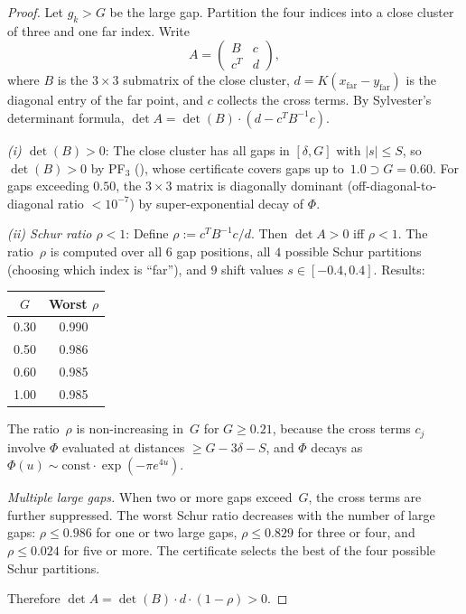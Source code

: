 \documentclass[11pt,a4paper]{amsart}
\theoremstyle{definition}
\theoremstyle{remark}
\begin{document}
\begin{proof}
Let $g_k > G$ be the large gap.
Partition the four indices into a close cluster of three and
one far index.
Write
\[
  A = \begin{pmatrix} B & c \\ c^T & d \end{pmatrix},
\]
where $B$ is the $3\times 3$ submatrix of the close cluster,
$d = K(x_{\text{far}} - y_{\text{far}})$ is the diagonal entry of
the far point, and $c$ collects the cross terms.
By Sylvester's determinant formula,
$\det A = \det(B)\cdot(d - c^T B^{-1} c)$.

\emph{(i) $\det(B) > 0$}:
The close cluster has all gaps in $[\delta, G]$ with $|s| \le S$,
so $\det(B) > 0$ by PF$_3$ (), whose certificate
covers gaps up to~$1.0 \supset G = 0.60$.
For gaps exceeding $0.50$, the $3\times 3$ matrix is
diagonally dominant (off-diagonal-to-diagonal ratio $< 10^{-7}$)
by super-exponential decay of $\Phi$.

\emph{(ii) Schur ratio $\rho < 1$}:
Define $\rho := c^T B^{-1} c / d$.
Then $\det A > 0$ iff $\rho < 1$.
The ratio~$\rho$ is computed over all $6$ gap positions,
all $4$ possible Schur partitions (choosing which index is ``far''),
and $9$ shift values $s \in [-0.4, 0.4]$.
Results:

\begin{center}
\begin{tabular}{@{}cc@{}}
\toprule
$G$ & Worst $\rho$ \\
\midrule
0.30 & 0.990 \\
0.50 & 0.986 \\
0.60 & 0.985 \\
1.00 & 0.985 \\
\bottomrule
\end{tabular}
\end{center}

The ratio~$\rho$ is non-increasing in~$G$ for $G \ge 0.21$,
because the cross terms $c_j$ involve $\Phi$ evaluated at
distances $\ge G - 3\delta - S$, and $\Phi$ decays as
$\Phi(u) \sim \text{const} \cdot \exp(-\pi e^{4u})$.

\emph{Multiple large gaps.}
When two or more gaps exceed~$G$, the cross terms are further
suppressed.
The worst Schur ratio decreases with the number of large gaps:
$\rho \le 0.986$ for one or two large gaps,
$\rho \le 0.829$ for three or four,
and $\rho \le 0.024$ for five or more.
The certificate selects the best of the four possible Schur
partitions.

Therefore $\det A = \det(B)\cdot d\cdot(1 - \rho) > 0$.
\end{proof}
\end{document}
